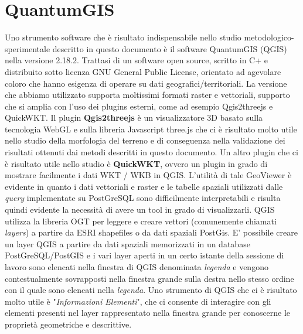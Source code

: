 \section{QuantumGIS}
\label{qgis}
Uno strumento software che è risultato indispensabile nello studio metodologico-sperimentale descritto in questo documento è il software QuantumGIS (QGIS) nella versione 2.18.2. Trattasi di un software open source, scritto in C+ e distribuito sotto licenza GNU General Public License, orientato ad agevolare coloro che hanno esigenza di operare su dati geografici/territoriali. La versione che abbiamo utilizzato supporta moltissimi formati raster e vettoriali, supporto che si amplia con l'uso dei plugins esterni, come ad esempio Qgis2threejs e QuickWKT. \newline
Il plugin \textbf{Qgis2threejs} è un visualizzatore 3D basato sulla tecnologia WebGL e sulla libreria Javascript three.js che ci è risultato molto utile nello studio della morfologia del terreno e di conseguenza nella validazione dei risultati ottenuti dai metodi descritti in questo documento. 
Un altro plugin che ci è risultato utile nello studio è \textbf{QuickWKT}, ovvero un plugin in grado di mostrare facilmente i dati WKT / WKB in QGIS. \newline
L'utilità di tale GeoViewer è evidente in quanto i dati vettoriali e raster e le tabelle spaziali utilizzati dalle \textit{query} implementate su PostGreSQL sono difficilmente interpretabili e risulta quindi evidente la necessità di avere un tool in grado di visualizzarli. QGIS utilizza la libreria OGT per leggere e creare vettori (comunemente chiamati \textit{layers}) a partire da ESRI shapefiles o da dati spaziali PostGis. E' possibile creare un layer QGIS a partire da dati spaziali memorizzati in un database PostGreSQL/PostGIS e i vari layer aperti in un certo istante della sessione di lavoro sono elencati nella finestra di QGIS denominata \textit{legenda} e vengono contestualmente sovrapposti nella finestra grande sulla destra nello stesso ordine con il quale sono elencati nella \textit{legenda}. Uno strumento di QGIS che ci è risultato molto utile è "\textit{Informazioni Elementi}", che ci consente di interagire con gli elementi presenti nel layer rappresentato nella finestra grande per conoscerne le proprietà geometriche e descrittive. 
